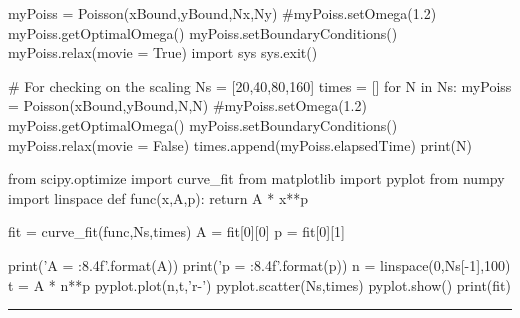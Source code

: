 \begin{codeexample}
\begin{VerbatimOut}{\listingFile}
myPoiss = Poisson(xBound,yBound,Nx,Ny)
#myPoiss.setOmega(1.2)
myPoiss.getOptimalOmega()
myPoiss.setBoundaryConditions()
myPoiss.relax(movie = True)
import sys
sys.exit()

# For checking on the scaling
Ns = [20,40,80,160]
times = []
for N in Ns:
    myPoiss = Poisson(xBound,yBound,N,N)
    #myPoiss.setOmega(1.2)
    myPoiss.getOptimalOmega()
    myPoiss.setBoundaryConditions()
    myPoiss.relax(movie = False)
    times.append(myPoiss.elapsedTime)
    print(N)

from scipy.optimize import curve_fit
from matplotlib import pyplot
from numpy import linspace
def func(x,A,p):
    return A * x**p

fit = curve_fit(func,Ns,times)
A = fit[0][0]
p = fit[0][1]

print('A = {:8.4f}'.format(A))
print('p = {:8.4f}'.format(p))
n = linspace(0,Ns[-1],100)
t = A * n**p
pyplot.plot(n,t,'r-')
pyplot.scatter(Ns,times)
pyplot.show()
print(fit)
\end{VerbatimOut}
\end{codeexample}
\else
\noindent\rule{5 in}{0.01 in}
\fi


